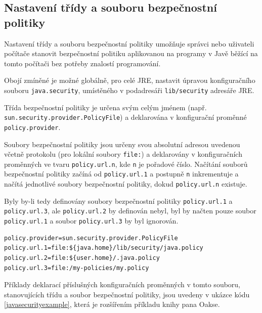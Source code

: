\subsection{Nastavení třídy a souboru bezpečnostní politiky}\label{souborPolitiky}

Nastavení třídy a souboru bezpečnostní politiky umožňuje správci nebo uživateli počítače stanovit bezpečnostní politiku aplikovanou na programy v Javě běžící na tomto počítači bez potřeby znalostí programování.

Obojí zmíněné je možné globálně, pro celé JRE, nastavit úpravou konfiguračního souboru {\tt java.security}, umístěného v podadresáři {\tt lib/security} adresáře JRE. \cite{refPolicyFiles}

Třída bezpečnostní politiky je určena svým celým jménem (např. {\tt sun.security.provider.PolicyFile}) a deklarována v konfigurační proměnné {\tt policy.provider}. \cite{refPolicyFiles}

Soubory bezpečnostní politiky jsou určeny svou absolutní adresou uvedenou včetně protokolu (pro lokální soubory {\tt file:}) a deklarovány v konfiguračních proměnných ve tvaru {\tt policy.url.n}, kde {\tt n} je pořadové číslo. Načítání souborů bezpečnostní politiky začíná od {\tt policy.url.1} a postupně {\tt n} inkrementuje a načítá jednotlivé soubory bezpečnostní politiky, dokud {\tt policy.url.n} existuje. \cite{refPolicyFiles}

Byly by-li tedy definovány soubory bezpečnostní politiky {\tt policy.url.1} a {\tt policy.url.3}, ale {\tt policy.url.2} by definován nebyl, byl by načten pouze soubor {\tt policy.url.1} a soubor {\tt policy.url.3} by byl ignorován. \cite{refPolicyFiles}

\begin{lstlisting}[caption=Význačnější proměnné konfiguračního souboru {\tt java.security}, label=javasecurityexample]
policy.provider=sun.security.provider.PolicyFile
policy.url.1=file:${java.home}/lib/security/java.policy
policy.url.2=file:${user.home}/.java.policy
policy.url.3=file:/my-policies/my.policy
\end{lstlisting}

Příklady deklarací příslušných konfiguračních proměnných v tomto souboru, stanovujících třídu a soubor bezpečnostní politiky, jsou uvedeny v ukázce kódu \ref{javasecurityexample}, která je rozšířením příkladu knihy pana Oakse. \cite[5.3.1]{oaks}

